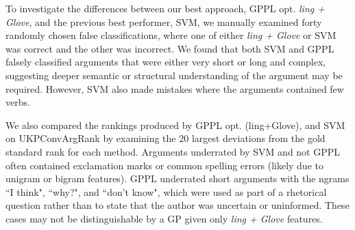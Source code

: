 To investigate the differences between our best approach, GPPL opt. \emph{ling + Glove}, 
and the previous best performer, SVM, 
we manually examined forty randomly chosen false classifications, where one of 
either  \emph{ling + Glove} or SVM was correct and the other was incorrect. 
We found that both SVM and GPPL falsely classified arguments that were either very short or long and complex, suggesting deeper semantic or structural understanding of the argument may be required. However, SVM also made mistakes
where the arguments contained few verbs.

We also compared the rankings produced by GPPL opt. (ling+Glove), 
and SVM on UKPConvArgRank by examining the 20 largest deviations from the 
gold standard rank for each method. Arguments underrated by SVM and not GPPL often 
contained exclamation marks or common spelling errors (likely due to unigram or bigram features).
GPPL underrated short arguments with the ngrams ``I think", ``why?", and
``don't know", which were used as part of a rhetorical question
rather than to state that the author was uncertain or uninformed.
These cases may not be distinguishable by a GP given only \emph{ling + Glove} features.

